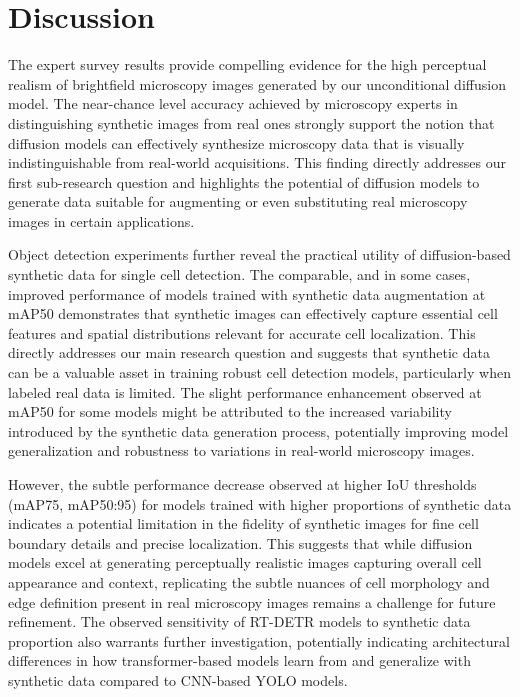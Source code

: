 \section{Discussion}
\label{sec:discussion}
The expert survey results provide compelling evidence for the high perceptual realism of brightfield microscopy images generated by our unconditional diffusion model.
The near-chance level accuracy achieved by microscopy experts in distinguishing synthetic images from real ones strongly support the notion that diffusion models can effectively synthesize microscopy data that is visually indistinguishable from real-world acquisitions.
This finding directly addresses our first sub-research question and highlights the potential of diffusion models to generate data suitable for augmenting or even substituting real microscopy images in certain applications.

Object detection experiments further reveal the practical utility of diffusion-based synthetic data for single cell detection.
The comparable, and in some cases, improved performance of models trained with synthetic data augmentation at mAP\@50 demonstrates that synthetic images can effectively capture essential cell features and spatial distributions relevant for accurate cell localization.
This directly addresses our main research question and suggests that synthetic data can be a valuable asset in training robust cell detection models, particularly when labeled real data is limited.
The slight performance enhancement observed at mAP\@50 for some models might be attributed to the increased variability introduced by the synthetic data generation process, potentially improving model generalization and robustness to variations in real-world microscopy images.

However, the subtle performance decrease observed at higher IoU thresholds (mAP\@75, mAP\@50:95) for models trained with higher proportions of synthetic data indicates a potential limitation in the fidelity of synthetic images for fine cell boundary details and precise localization.
This suggests that while diffusion models excel at generating perceptually realistic images capturing overall cell appearance and context, replicating the subtle nuances of cell morphology and edge definition present in real microscopy images remains a challenge for future refinement.
The observed sensitivity of RT-DETR models to synthetic data proportion also warrants further investigation, potentially indicating architectural differences in how transformer-based models learn from and generalize with synthetic data compared to CNN-based YOLO models.

